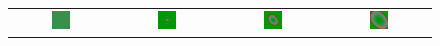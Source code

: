 \begin{figure}[h]
\centering
\mySfFamily
\begin{tabular}{c c c c}
\includegraphics[width = 0.2\textwidth]{../images/predator_prey_11_by_11_f_1_k_2.png} & \includegraphics[width = 0.2\textwidth]{../images/../images/predator_prey_11_by_11_f_1_k_2_i1.png} & \includegraphics[width = 0.2\textwidth]{../images/../images/predator_prey_11_by_11_f_1_k_2_i2.png} & \includegraphics[width = 0.2\textwidth]{../images/../images/predator_prey_11_by_11_f_1_k_2_i3.png}\\[2ex]

\end{tabular}
\end{figure}
